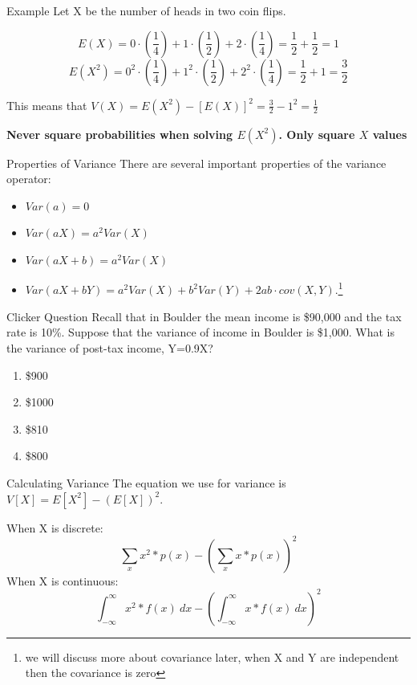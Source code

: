 \documentclass{beamer}
\begin{document}
\begin{frame}{Example}
	Let X be the number of heads in two coin flips. 

	\[ 
		E(X) = 0 \cdot (\frac{1}{4})+ 1 \cdot (\frac{1}{2}) + 2 \cdot (\frac{1}{4}) = \frac{1}{2} + \frac{1}{2} = 1
	\]
	\[ 
		E(X^2) = 0^2 \cdot (\frac{1}{4})+ 1^2 \cdot (\frac{1}{2}) + 2^2 \cdot  (\frac{1}{4}) = \frac{1}{2} + 1 = \frac{3}{2}
	\]
		
	This means that $V(X)=E(X^2)-[E(X)]^2 = \frac{3}{2}-1^2 = \frac{1}{2}$
		
	\textbf{Never square probabilities when solving $E(X^2)$. Only square $X$ values}
\end{frame}

\begin{frame}{Properties of Variance}
	There are several important properties of the variance operator:
	\begin{itemize}
		\item $Var(a)=0$
		\item $Var(aX)=a^2Var(X)$
		\item $Var(aX+b) = a^2Var(X)$
		\item $Var(aX+bY)=a^2Var(X)+b^2Var(Y)+2ab\cdot cov(X,Y).$\footnote{we will discuss more about covariance later, when X and Y are independent then the covariance is zero}
	\end{itemize}
\end{frame}

\begin{frame}{Clicker Question}
	Recall that in Boulder the mean income is \$90,000 and the tax rate is 10\%. Suppose that the variance of income in Boulder is \$1,000. What is the variance of post-tax income, Y=0.9X?
	\begin{enumerate}[label=(\alph*)]
		\item \$900
		\item \$1000
		\item \$810
		\item \$800
	\end{enumerate}
\end{frame}

\begin{frame}{Calculating Variance}
	The equation we use for variance is $V[X]=E[X^2]-(E[X])^2$.

	When X is \alert{discrete}:
	\[
		\sum_x x^2*p(x) -(\sum_x x*p(x))^2
	\]
	When X is \alert{continuous}:
	\[
		\int^\infty_{-\infty} x^2 * f(x) \ dx - \left(\int^\infty_{-\infty} x * f(x) \ dx \right )^2
	\]
\end{frame}
\end{document}
